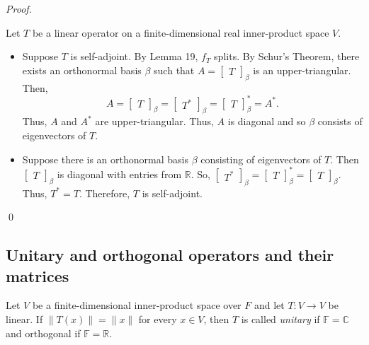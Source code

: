 \documentclass[12pt]{article}
\newenvironment{definition}[2][Definition]{\begin{trivlist}
\item[\hskip \labelsep {\bfseries #1}\hskip \labelsep {\bfseries #2}]}{\end{trivlist}}
\newenvironment{sol}
    {\emph{Proof.}
    }
    {
    \qed
    }
\begin{document}
\vspace{1em}

\begin{sol}
Let $T$ be a linear operator on a finite-dimensional real inner-product space $V$.
\begin{itemize}
    \item[$\Longrightarrow$] Suppose $T$ is self-adjoint. By Lemma 19, $f_T$ splits. By Schur's Theorem, there exists an orthonormal basis $\beta$ such that $A = \begin{bmatrix}
    T
    \end{bmatrix}_\beta$ is an upper-triangular. Then, $$A = \begin{bmatrix}
    T
    \end{bmatrix}_\beta = \begin{bmatrix}
    T^*
    \end{bmatrix}_\beta = \begin{bmatrix}
    T
    \end{bmatrix}_\beta^* = A^*.$$ Thus, $A$ and $A^*$ are upper-triangular. Thus, $A$ is diagonal and so $\beta$ consists of eigenvectors of $T$.
    
    \item[$\Longleftarrow$] Suppose there is an orthonormal basis $\beta$ consisting of eigenvectors of $T$. Then $\begin{bmatrix}
    T
    \end{bmatrix}_\beta$ is diagonal with entries from $\mathbb{R}$. So, $\begin{bmatrix}
    T^*
    \end{bmatrix}_\beta = \begin{bmatrix}
    T
    \end{bmatrix}_\beta^* = \begin{bmatrix}
    T
    \end{bmatrix}_\beta$. Thus, $T^* = T$. Therefore, $T$ is self-adjoint.
\end{itemize}
\end{sol}

\subsection{Unitary and orthogonal operators and their matrices}

\begin{definition}{9}
Let $V$ be a finite-dimensional inner-product space over $F$ and let $T : V \to V$ be linear. If $\lVert T(x) \rVert = \lVert x \rVert$ for every $x \in V$, then $T$ is called \textit{unitary} if $\mathbb{F} = \mathbb{C}$ and orthogonal if $\mathbb{F} = \mathbb{R}$. 
\end{definition}
\end{document}
